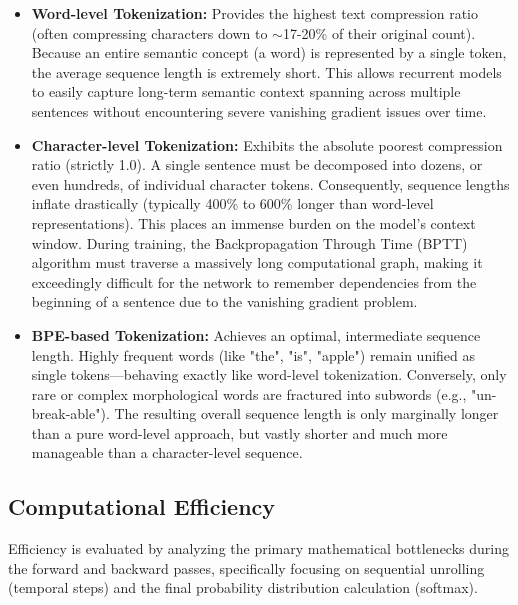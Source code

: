 \begin{itemize}
    \item \textbf{Word-level Tokenization:} Provides the highest text compression ratio (often compressing characters down to $\sim$17-20\% of their original count). Because an entire semantic concept (a word) is represented by a single token, the average sequence length is extremely short. This allows recurrent models to easily capture long-term semantic context spanning across multiple sentences without encountering severe vanishing gradient issues over time.
    \item \textbf{Character-level Tokenization:} Exhibits the absolute poorest compression ratio (strictly 1.0). A single sentence must be decomposed into dozens, or even hundreds, of individual character tokens. Consequently, sequence lengths inflate drastically (typically 400\% to 600\% longer than word-level representations). This places an immense burden on the model's context window. During training, the Backpropagation Through Time (BPTT) algorithm must traverse a massively long computational graph, making it exceedingly difficult for the network to remember dependencies from the beginning of a sentence due to the vanishing gradient problem.
    \item \textbf{BPE-based Tokenization:} Achieves an optimal, intermediate sequence length. Highly frequent words (like "the", "is", "apple") remain unified as single tokens—behaving exactly like word-level tokenization. Conversely, only rare or complex morphological words are fractured into subwords (e.g., "un-break-able"). The resulting overall sequence length is only marginally longer than a pure word-level approach, but vastly shorter and much more manageable than a character-level sequence.
\end{itemize}

\subsection{Computational Efficiency}
Efficiency is evaluated by analyzing the primary mathematical bottlenecks during the forward and backward passes, specifically focusing on sequential unrolling (temporal steps) and the final probability distribution calculation (softmax).

